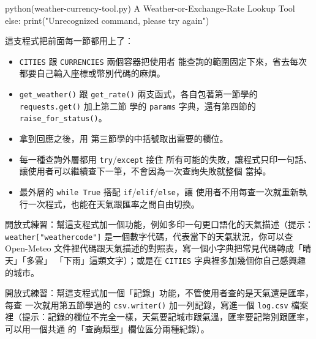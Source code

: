 \begin{example}{python}{(weather-currency-tool.py) A Weather-or-Exchange-Rate Lookup Tool}
    else:
        print("Unrecognized command, please try again")
\end{example}


這支程式把前面每一節都用上了：

\begin{itemize}
\item \texttt{CITIES} 跟 \texttt{CURRENCIES} 兩個容器把使用者
能查詢的範圍固定下來，省去每次都要自己輸入座標或幣別代碼的麻煩。
\item \texttt{get\_weather()}
跟 \texttt{get\_rate()} 兩支函式，各自包著第一節學的 \texttt{requests.get()} 加上第二節
學的 \texttt{params} 字典，還有第四節的 \texttt{raise\_for\_status()}。
\item 拿到回應之後，用
第三節學的中括號取出需要的欄位。
\item 每一種查詢外層都用 \texttt{try}/\texttt{except} 接住
所有可能的失敗，讓程式只印一句話、讓使用者可以繼續查下一筆，不會因為一次查詢失敗就整個
當掉。
\item 最外層的 \texttt{while True} 搭配 \texttt{if}/\texttt{elif}/\texttt{else}，讓
使用者不用每查一次就重新執行一次程式，也能在天氣跟匯率之間自由切換。
\end{itemize}

\begin{drills}[label=drills:weather-tool]
\item 開放式練習：幫這支程式加一個功能，例如多印一句更口語化的天氣描述（提示：
\texttt{weather["weathercode"]} 是一個數字代碼，代表當下的天氣狀況，你可以查
Open-Meteo 文件裡代碼跟天氣描述的對照表，寫一個小字典把常見代碼轉成「晴天」「多雲」
「下雨」這類文字）；或是在 \texttt{CITIES} 字典裡多加幾個你自己感興趣的城市。
\item 開放式練習：幫這支程式加一個「記錄」功能，不管使用者查的是天氣還是匯率，每查
一次就用第五節學過的 \texttt{csv.writer()} 加一列記錄，寫進一個 \texttt{log.csv} 檔案
裡（提示：記錄的欄位不完全一樣，天氣要記城市跟氣溫，匯率要記幣別跟匯率，可以用一個共通
的「查詢類型」欄位區分兩種紀錄）。
\end{drills}

